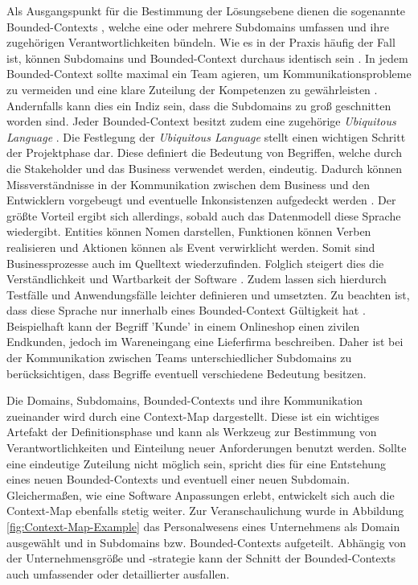 Als Ausgangspunkt für die Bestimmung der Lösungsebene dienen die sogenannte Bounded-Contexts \cite[S. 57]{Vernon.2015}, welche eine oder mehrere Subdomains umfassen und ihre zugehörigen Verantwortlichkeiten bündeln. Wie es in der Praxis häufig der Fall ist, können Subdomains und Bounded-Context durchaus identisch sein \cite[S. 57]{Vernon.2015}. In jedem Bounded-Context sollte maximal ein Team agieren, um Kommunikationsprobleme zu vermeiden und eine klare Zuteilung der Kompetenzen zu gewährleisten \cite{Brandolini.2021}. Andernfalls kann dies ein Indiz sein, dass die Subdomains zu groß geschnitten worden sind. Jeder Bounded-Context besitzt zudem eine zugehörige \emph{Ubiquitous Language} \cite[S. 62]{Vernon.2015}. Die Festlegung der \emph{Ubiquitous Language} stellt einen wichtigen Schritt der Projektphase dar. Diese definiert die Bedeutung von Begriffen, welche durch die Stakeholder und das Business verwendet werden, eindeutig. Dadurch können Missverständnisse in der Kommunikation zwischen dem Business und den Entwicklern vorgebeugt und eventuelle Inkonsistenzen aufgedeckt werden \cite[S. 336f.]{Evans.2011}. Der größte Vorteil ergibt sich allerdings, sobald auch das Datenmodell diese Sprache wiedergibt. Entities können Nomen darstellen, Funktionen können Verben realisieren und Aktionen können als Event verwirklicht werden. Somit sind Businessprozesse auch im Quelltext wiederzufinden. Folglich steigert dies die Verständlichkeit und Wartbarkeit der Software \cite[S. 24ff.]{Evans.2011}. Zudem lassen sich hierdurch Testfälle und Anwendungsfälle leichter definieren und umsetzten. Zu beachten ist, dass diese Sprache nur innerhalb eines Bounded-Context Gültigkeit hat \cite[S. 62]{Vernon.2015}. Beispielhaft kann der Begriff 'Kunde' in einem Onlineshop einen zivilen Endkunden, jedoch im Wareneingang eine Lieferfirma beschreiben. Daher ist bei der Kommunikation zwischen Teams unterschiedlicher Subdomains zu berücksichtigen, dass Begriffe eventuell verschiedene Bedeutung besitzen. 

Die Domains, Subdomains, Bounded-Contexts und ihre Kommunikation zueinander wird durch eine Context-Map dargestellt. Diese ist ein wichtiges Artefakt der Definitionsphase und kann als Werkzeug zur Bestimmung von Verantwortlichkeiten und Einteilung neuer Anforderungen benutzt werden. Sollte eine eindeutige Zuteilung nicht möglich sein, spricht dies für eine Entstehung eines neuen Bounded-Contexts und eventuell einer neuen Subdomain. Gleichermaßen, wie eine Software Anpassungen erlebt, entwickelt sich auch die Context-Map ebenfalls stetig weiter. Zur Veranschaulichung wurde in Abbildung \ref{fig:Context-Map-Example} das Personalwesens eines Unternehmens als Domain ausgewählt und in Subdomains bzw. Bounded-Contexts aufgeteilt. Abhängig von der Unternehmensgröße und -strategie kann der Schnitt der Bounded-Contexts auch umfassender oder detaillierter ausfallen.

